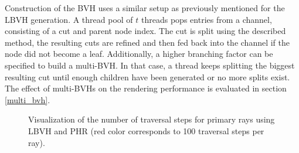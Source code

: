 Construction of the BVH uses a similar setup as previously mentioned for the LBVH generation. A thread pool of $t$ threads pops entries from a channel, consisting of a cut and parent node index. The cut is split using the described method, the resulting cuts are refined and then fed back into the channel if the node did not become a leaf. Additionally, a higher branching factor can be specified to build a multi-BVH\cite{wald08multibvh}. In that case, a thread keeps splitting the biggest resulting cut until enough children have been generated or no more splits exist. The effect of multi-BVHs on the rendering performance is evaluated in section \ref{multi_bvh}.

\begin{figure}[H]
    \centering
    \hfill
    \hfill
    \caption{Visualization of the number of traversal steps for primary rays using LBVH and PHR (red color corresponds to 100 traversal steps per ray).}
    \label{fig:noise}
\end{figure}
